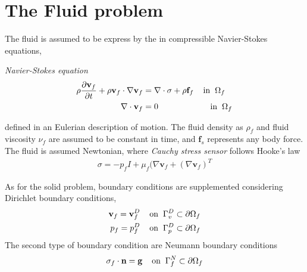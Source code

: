 \section{The Fluid problem}
\label{sec:fluidprob}
The fluid is assumed to be express by the in compressible Navier-Stokes equations,
\begin{equat}
\textit{Navier-Stokes equation}
\begin{align}
\rho \pder{\mathbf{v}_f}{t} + \rho \mathbf{v}_f \cdot \nabla \mathbf{v}_f &=
\nabla \cdot \sigma + \rho \mathbf{f}_f \hspace{4mm} \text{in} \hspace{2mm} \Omega_f \\
\nabla \cdot \mathbf{v}_f &= 0 \hspace{22mm} \text{in} \hspace{2mm} \Omega_f 
\end{align} 
\end{equat}
defined in an Eulerian description of motion. The fluid density as $\rho_f$ and fluid viscosity $\nu_f$  are assumed to be constant in time, and $\mathbf{f}_s$ represents any body force. 
The fluid is assumed Newtonian, where \textit{Cauchy stress sensor} follows Hooke's law
\begin{align*}
\sigma = -p_f I + \mu_f (\nabla \mathbf{v}_f + (\nabla \mathbf{v}_f)^T
\end{align*}

As for the solid problem, boundary conditions are supplemented considering  Dirichlet boundary conditions, 
\begin{align}
\mathbf{v}_f = \mathbf{v}_f^D 
\hspace{4mm} \text{on} \hspace{2mm} \Gamma_v^D \subset \partial \Omega_f \\
p_f = p_f^D 
\hspace{4mm} \text{on} \hspace{2mm} \Gamma_p^D \subset \partial \Omega_f
\end{align}
The second type of boundary condition are Neumann boundary conditions
\begin{align}
\sigma_f \cdot \mathbf{n} = \mathbf{g} 
\hspace{4mm} \text{on} \hspace{2mm} \Gamma_f^N \subset \partial \Omega_f 
\end{align}

